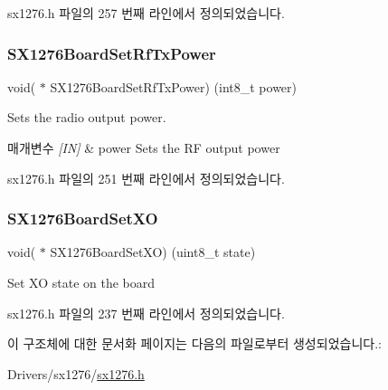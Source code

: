 sx1276.\+h 파일의 257 번째 라인에서 정의되었습니다.

\mbox{\label{structs_board_callback_aa681fd32fe9ab596fbc60624d0510bb6}} 
\subsubsection{\texorpdfstring{S\+X1276\+Board\+Set\+Rf\+Tx\+Power}{SX1276BoardSetRfTxPower}}
{\footnotesize\ttfamily void( $\ast$ S\+X1276\+Board\+Set\+Rf\+Tx\+Power) (int8\+\_\+t power)}



Sets the radio output power. 


\begin{DoxyParams}{매개변수}
{\em \mbox{[}\+I\+N\mbox{]}} & power Sets the RF output power \\
\hline
\end{DoxyParams}


sx1276.\+h 파일의 251 번째 라인에서 정의되었습니다.

\mbox{\label{structs_board_callback_ad7ed5ef4ab2e13b2839e6df3b1f049a3}} 
\subsubsection{\texorpdfstring{S\+X1276\+Board\+Set\+XO}{SX1276BoardSetXO}}
{\footnotesize\ttfamily void( $\ast$ S\+X1276\+Board\+Set\+XO) (uint8\+\_\+t state)}



Set XO state on the board 



sx1276.\+h 파일의 237 번째 라인에서 정의되었습니다.



이 구조체에 대한 문서화 페이지는 다음의 파일로부터 생성되었습니다.\+:\begin{DoxyCompactItemize}
\item 
Drivers/sx1276/\mbox{\hyperlink{sx1276_8h}{sx1276.\+h}}\end{DoxyCompactItemize}
